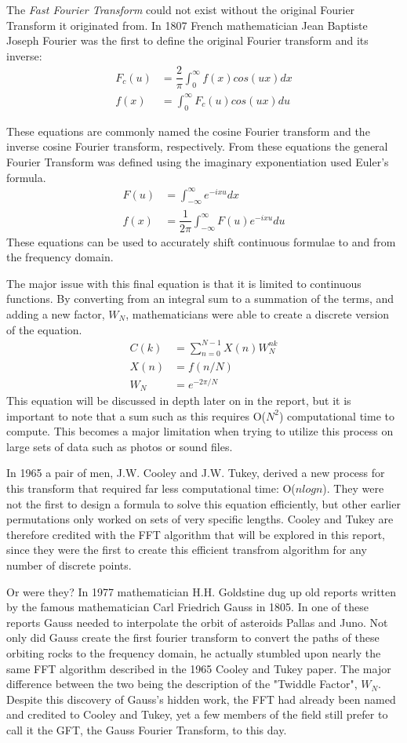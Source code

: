 The \textit{Fast Fourier Transform} could not exist without the original Fourier Transform it originated from. In 1807 French mathematician Jean Baptiste Joseph Fourier was the first to define the original Fourier transform and its inverse:
\begin{align*}
F_c(u) &= \dfrac{2}{\pi}\int_{0}^{\infty} f(x) cos(ux)dx\\
f(x) &= \int_{0}^{\infty}F_c(u)cos(ux)du
\end{align*}

These equations are commonly named the cosine Fourier transform and the inverse cosine Fourier transform, respectively. From these equations the general Fourier Transform was defined using the imaginary exponentiation used Euler's formula.
\begin{align*}
F(u) &= \int_{-\infty}^{\infty}e^{-ixu}dx\\
f(x) &= \dfrac{1}{2\pi}\int_{-\infty}^{\infty}F(u)e^{-ixu}du
\end{align*}
These equations can be used to accurately shift continuous formulae to and from the frequency domain.

The major issue with this final equation is that it is limited to continuous functions. By converting from an integral sum to a summation of the terms, and adding a new factor, $W_N$, mathematicians were able to create a discrete version of the equation.
\begin{align*}
C(k) &= \sum_{n = 0}^{N-1}X(n)W_N^{nk}\\
X(n) &= f(n/N)\\
W_N &= e^{-2\pi/N}
\end{align*}
This equation will be discussed in depth later on in the report, but it is important to note that a sum such as this requires O($N^2$) computational time to compute. This becomes a major limitation when trying to utilize this process on large sets of data such as photos or sound files.

In 1965 a pair of men, J.W. Cooley and J.W. Tukey, derived a new process for this transform that required far less computational time: O($nlogn$). They were not the first to design a formula to solve this equation efficiently, but other earlier permutations only worked on sets of very specific lengths. Cooley and Tukey are therefore credited with the FFT algorithm that will be explored in this report, since they were the first to create this efficient transfrom algorithm for any number of discrete points.

Or were they? In 1977 mathematician H.H. Goldstine dug up  old reports written by the famous mathematician Carl Friedrich Gauss in 1805. In one of these reports Gauss needed to interpolate the orbit of asteroids Pallas and Juno. Not only did Gauss create the first fourier transform to convert the paths of these orbiting rocks to the frequency domain, he actually stumbled upon nearly the same FFT algorithm described in the 1965 Cooley and Tukey paper. The major difference between the two being the description of the "Twiddle Factor", $W_N$. Despite this discovery of Gauss's hidden work, the FFT had already been named and credited to Cooley and Tukey, yet  a few members of the field still prefer to call it the GFT, the Gauss Fourier Transform, to this day.
